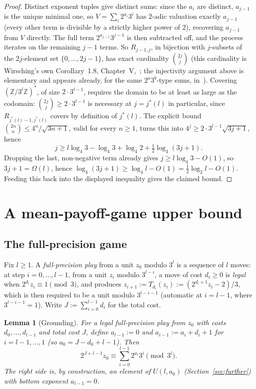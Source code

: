 \documentclass[11pt]{amsart}
\theoremstyle{plain}
\newtheorem{lemma}[theorem]{Lemma}
\theoremstyle{definition}
\theoremstyle{remark}
\newcommand{\Z}{\mathbb{Z}}
\begin{document}
\begin{proof}
Distinct exponent tuples give distinct sums: since the $a_i$ are distinct, $a_{j-1}$ is the unique
minimal one, so $V=\sum_i 2^{a_i}3^i$ has $2$-adic valuation exactly $a_{j-1}$ (every other term is
divisible by a strictly higher power of $2$), recovering $a_{j-1}$ from $V$ directly. The full term
$2^{a_{j-1}}3^{j-1}$ is then subtracted off, and the process iterates on the remaining $j-1$ terms. So $R_{j-1,j}$, in bijection with $j$-subsets of the
$2j$-element set $\{0,\dots,2j-1\}$, has exact cardinality $\binom{2j}{j}$ (this cardinality is
Wirsching's own Corollary~1.8, Chapter~V,~\cite{wirsching1998}; the injectivity argument above is
elementary and appears already, for the same $2^a3^b$-type sums, in~\cite{tao2011blog}).
Covering
$(\Z/3^l\Z)^*$, of size $2\cdot3^{l-1}$, requires the domain to be at least as large as the
codomain: $\binom{2j}{j} \ge 2\cdot3^{l-1}$ is necessary at $j=j^*(l)$ in particular, since
$R_{j^*(l)-1,j^*(l)}$ covers by definition of $j^*(l)$. The explicit bound
$\binom{2n}{n} \le 4^n/\sqrt{3n+1}$, valid for every $n\ge1$, turns this into
$4^j \ge 2\cdot3^{l-1}\sqrt{3j+1}$, hence
\[
j \ge l\log_4 3 - \log_4 3 + \log_4 2 + \tfrac12\log_4(3j+1).
\]
Dropping the last, non-negative term already gives $j \ge l\log_4 3 - O(1)$, so
$3j+1 = \Omega(l)$, hence $\log_4(3j+1) \ge \log_4 l - O(1) = \tfrac12\log_2 l - O(1)$. Feeding
this back into the displayed inequality gives the claimed bound.
\end{proof}

\section{A mean-payoff-game upper bound}
\label{sec:mpg}

\subsection*{The full-precision game}

Fix $l\ge1$. A \emph{full-precision play} from a unit $z_0$ modulo $3^l$ is a sequence of $l$ moves:
at step $i=0,\dots,l-1$, from a unit $z_i$ modulo $3^{l-i}$, a move of cost $d_i\ge0$ is
\emph{legal} when $2^{d_i}z_i\equiv1\pmod3$, and produces $z_{i+1}:=T_{d_i}(z_i):=(2^{d_i+1}z_i-2)/3$,
which is then required to be a unit modulo $3^{l-i-1}$ (automatic at $i=l-1$, where $3^{l-i-1}=1$).
Write $J:=\sum_{i=0}^{l-1}d_i$ for the total cost.

\begin{lemma}[Grounding]
\label{lem:ground}
For a legal full-precision play from $z_0$ with costs $d_0,\dots,d_{l-1}$ and total cost $J$, define
$a_{l-1}:=0$ and $a_{i-1}:=a_i+d_i+1$ for $i=l-1,\dots,1$ (so $a_0=J-d_0+l-1$). Then
\[
2^{J+l-1}z_0 \equiv \sum_{i=0}^{l-1} 2^{a_i}3^i \pmod{3^l}.
\]
The right side is, by construction, an element of $U(l,a_0)$ (Section~\ref{sec:further}) with bottom
exponent $a_{l-1}=0$.
\end{lemma}
\end{document}
